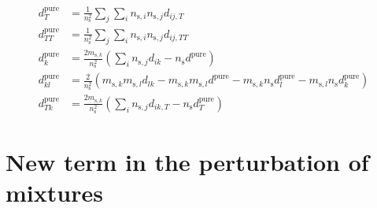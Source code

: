 \documentclass[english]{../thermomemo/thermomemo}
\newcommand*{\lb}{\left(}
\newcommand*{\rb}{\right)}
\newcommand{\seg}{\ensuremath{\text{s}}\xspace}
\newcommand{\pure}{\ensuremath{\text{pure}}\xspace}
\begin{document}
\begin{align}
  \label{eq:d_pure_ms_diff}
  d^{\pure}_T &=  \frac{1}{n_\seg^2} \sum_j \sum_i n_{\seg,i} n_{\seg,j} d_{ij,T}\\
  d^{\pure}_{TT} &=  \frac{1}{n_\seg^2} \sum_j \sum_i n_{\seg,i} n_{\seg,j} d_{ij,TT}\\
  d^{\pure}_{k} &=  \frac{2 m_{\seg,k}}{n_\seg^2} \lb \sum_i  n_{\seg,j} d_{ik} - n_\seg d^{\pure}  \rb\\
  d^{\pure}_{kl} &=  \frac{2}{n_\seg^2} \lb  m_{\seg,k}m_{\seg,l} d_{lk} - m_{\seg,k}m_{\seg,l} d^{\pure} - m_{\seg,k} n_\seg d^{\pure}_l - m_{\seg,l} n_\seg d^{\pure}_k \rb \\
  d^{\pure}_{Tk} &=  \frac{2 m_{\seg,k}}{n_\seg^2} \lb \sum_i  n_{\seg,j} d_{ik,T} - n_\seg d^{\pure}_T  \rb
\end{align}

\section{New term in the perturbation of mixtures}
\end{document}
